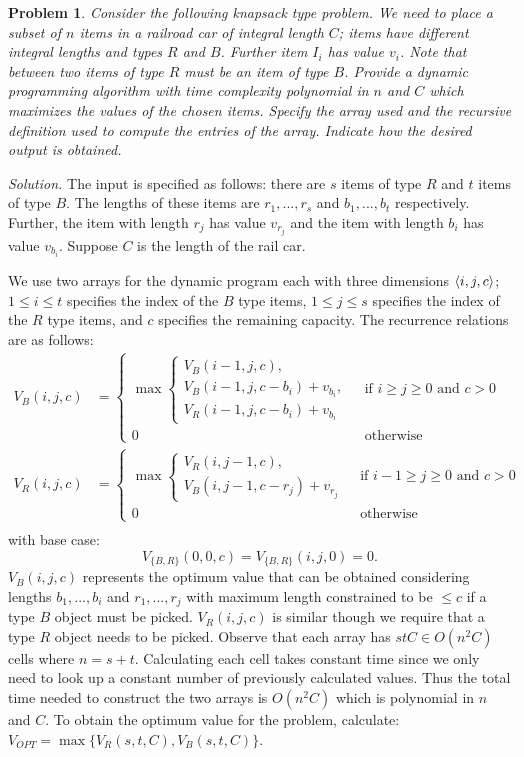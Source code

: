 \documentclass[11pt]{article}
\newtheorem{problem}{Problem}
\DeclarePairedDelimiter\anglebrac{\langle}{\rangle}
\begin{document}
\begin{problem}
Consider the following knapsack type problem. We need to place a subset of $n$ items in a railroad car of integral length $C$; items have different integral lengths and types $R$ and $B$. Further item $I_i$ has value $v_i$. Note that between two items of type $R$ must be an item of type $B$. Provide a dynamic programming algorithm with time complexity polynomial in $n$ and $C$ which maximizes the values of the chosen items. Specify the array used and the recursive definition used to compute the entries of the array. Indicate how the desired output is obtained. 
\end{problem}

\emph{Solution.} The input is specified as follows: there are $s$ items of type $R$ and $t$ items of type $B$. The lengths of these items are $r_1, ..., r_s$ and $b_1, ..., b_t$ respectively. Further, the item with length $r_j$ has value $v_{r_j}$ and the item with length $b_i$ has value $v_{b_i}$. Suppose $C$ is the length of the rail car.

We use two arrays for the dynamic program each with three dimensions $\anglebrac{i, j, c}$; $1 \leq i \leq t$ specifies the index of the $B$ type items, $1 \leq j \leq s$ specifies the index of the $R$ type items, and $c$ specifies the remaining capacity. The recurrence relations are as follows:
\begin{align*}
V_B(i, j, c) &= \begin{cases}
\max
\begin{cases}
V_B(i-1, j, c),\\
V_B(i-1, j, c-b_i) + v_{b_i},\\
V_R(i-1, j, c-b_i) + v_{b_i}
\end{cases}
  &\mbox{ if } i \geq j \geq 0 \mbox{ and } c > 0\\
0 &\mbox{ otherwise}
\end{cases}\\
V_R(i, j, c) &= \begin{cases}
\max
\begin{cases}
V_R(i, j-1, c),\\
V_B(i, j-1, c-r_j) + v_{r_j}
\end{cases}
  &\mbox{ if } i - 1 \geq j \geq 0 \mbox{ and } c > 0\\
0 &\mbox{ otherwise}
\end{cases}\\
\end{align*}
with base case:
\[V_{\{B,R\}}(0,0,c) = V_{\{B, R\}}(i,j,0) = 0.\]
$V_B(i, j, c)$ represents the optimum value that can be obtained considering lengths $b_1, ..., b_i$ and $r_1, ..., r_j$ with maximum length constrained to be $\leq c$ if a type $B$ object must be picked. $V_R(i, j, c)$ is similar though we require that a type $R$ object needs to be picked. Observe that each array has $stC \in O(n^2C)$ cells where $n = s + t$. Calculating each cell takes constant time since we only need to look up a constant number of previously calculated values. Thus the total time needed to construct the two arrays is $O(n^2C)$ which is polynomial in $n$ and $C$. To obtain the optimum value for the problem, calculate: $V_{OPT} = \max\{V_R(s,t,C), V_B(s,t,C)\}$.
\end{document}
